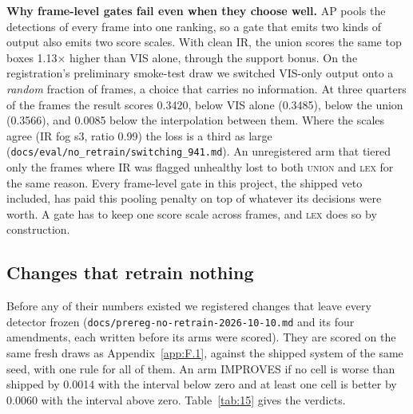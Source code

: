 \documentclass[journal,onecolumn]{IEEEtran}
\begin{document}
\textbf{Why frame-level gates fail even when they choose well.} AP pools the detections of every frame into one ranking, so a gate that emits two kinds of output also emits two score scales. With clean IR, the union scores the same top boxes 1.13$\times$ higher than VIS alone, through the support bonus. On the registration's preliminary smoke-test draw we switched VIS-only output onto a \emph{random} fraction of frames, a choice that carries no information. At three quarters of the frames the result scores 0.3420, below VIS alone (0.3485), below the union (0.3566), and 0.0085 below the interpolation between them. Where the scales agree (IR fog s3, ratio 0.99) the loss is a third as large (\texttt{docs/\allowbreak{}eval/\allowbreak{}no\_\allowbreak{}retrain/\allowbreak{}switching\_\allowbreak{}941.md}). An unregistered arm that tiered only the frames where IR was flagged unhealthy lost to both \textsc{union} and \textsc{lex} for the same reason. Every frame-level gate in this project, the shipped veto included, has paid this pooling penalty on top of whatever its decisions were worth. A gate has to keep one score scale across frames, and \textsc{lex} does so by construction.

\subsection{Changes that retrain nothing}\label{app:F.2}
Before any of their numbers existed we registered changes that leave every detector frozen (\texttt{docs/\allowbreak{}prereg-\allowbreak{}no-\allowbreak{}retrain-\allowbreak{}2026-\allowbreak{}10-\allowbreak{}10.md} and its four amendments, each written before its arms were scored). They are scored on the same fresh draws as Appendix~\ref{app:F.1}, against the shipped system of the same seed, with one rule for all of them. An arm IMPROVES if no cell is worse than shipped by 0.0014 with the interval below zero and at least one cell is better by 0.0060 with the interval above zero. Table~\ref{tab:15} gives the verdicts.
\end{document}
